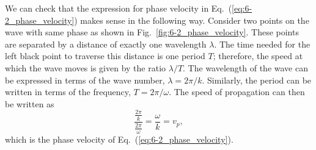 We can check that the expression for phase velocity in Eq.~(\ref{eq:6-2_phase_velocity}) makes sense in the following way.
Consider two points on the wave with same phase as shown in Fig.~\ref{fig:6-2_phase_velocity}.
These points are separated by a distance of exactly one wavelength $\lambda$.
The time needed for the left black point to traverse this distance is one period $T$;
therefore, the speed at which the wave moves is given by the ratio $\lambda / T$.
The wavelength of the wave can be expressed in terms of the wave number, $\lambda = 2\pi / k$.
Similarly, the period can be written in terms of the frequency, $T = 2\pi / \omega$.
The speed of propagation can then be written as
\begin{equation}
    \frac{\frac{2\pi}{k}}{\frac{2\pi}{\omega}} = \frac{\omega}{k} = v_p,
\end{equation}
which is the phase velocity of Eq.~(\ref{eq:6-2_phase_velocity}).


